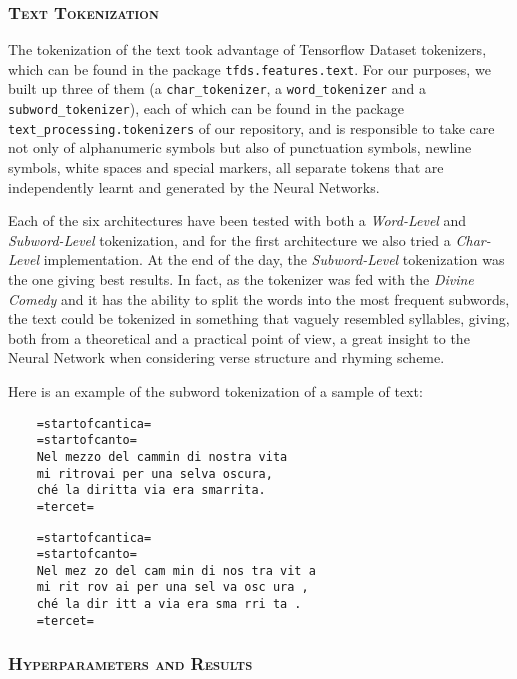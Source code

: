 \subsubsection{\textsc{Text Tokenization}}

The tokenization of the text took advantage of Tensorflow Dataset tokenizers, which can be found in the package \texttt{tfds.features.text}.
For our purposes, we built up three of them (a \texttt{char\_tokenizer}, a \texttt{word\_tokenizer} and a \texttt{subword\_tokenizer}), each of which can be found in the package \texttt{text\_processing.tokenizers} of our repository, and is responsible to take care not only of alphanumeric symbols but also of punctuation symbols, newline symbols, white spaces and special markers, all separate tokens that are independently learnt and generated by the Neural Networks.

Each of the six architectures have been tested with both a \textit{Word-Level} and \textit{Subword-Level} tokenization, and for the first architecture we also tried a \textit{Char-Level} implementation.
At the end of the day, the \textit{Subword-Level} tokenization was the one giving best results.
In fact, as the tokenizer was fed with the \textit{Divine Comedy} and it has the ability to split the words into the most frequent subwords, the text could be tokenized in something that vaguely resembled syllables, giving, both from a theoretical and a practical point of view, a great insight to the Neural Network when considering verse structure and rhyming scheme. 

Here is an example of the subword tokenization of a sample of text:

\begin{paracol}{2}
\scriptsize{\begin{verbatim}
    =startofcantica=
    =startofcanto=
    Nel mezzo del cammin di nostra vita
    mi ritrovai per una selva oscura,
    ché la diritta via era smarrita.
    =tercet=
\end{verbatim}}
\switchcolumn
\scriptsize{\begin{verbatim}
    =startofcantica=
    =startofcanto=
    Nel mez zo del cam min di nos tra vit a
    mi rit rov ai per una sel va osc ura ,
    ché la dir itt a via era sma rri ta .
    =tercet=
\end{verbatim}}
\end{paracol}

\subsubsection{\textsc{Hyperparameters and Results}}

